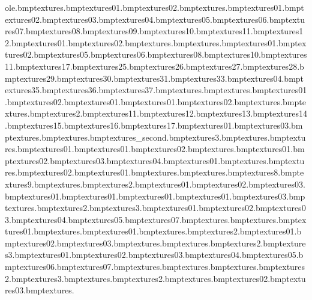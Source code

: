 ole.bmp textures\canlids.bmp textures\canmachineshutter01.bmp textures\canmachineshutter02.bmp textures\cardback.bmp textures\cardboard01.bmp textures\cardboard02.bmp textures\cardboard03.bmp textures\cardboard04.bmp textures\cardboard05.bmp textures\cardboard06.bmp textures\cardboard07.bmp textures\cardboard08.bmp textures\cardboard09.bmp textures\cardboard10.bmp textures\cardboard11.bmp textures\cardboard12.bmp textures\cards01.bmp textures\cards02.bmp textures\cashwindow.bmp textures\castleport.bmp textures\ceramictile01.bmp textures\ceramictile02.bmp textures\ceramictile05.bmp textures\ceramictile06.bmp textures\ceramictile08.bmp textures\ceramictile10.bmp textures\ceramictile11.bmp textures\ceramictile17.bmp textures\ceramictile25.bmp textures\ceramictile26.bmp textures\ceramictile27.bmp textures\ceramictile28.bmp textures\ceramictile29.bmp textures\ceramictile30.bmp textures\ceramictile31.bmp textures\ceramictile33.bmp textures\shopsgensign04.bmp textures\ceramictile35.bmp textures\ceramictile36.bmp textures\ceramictile37.bmp textures\cerealsides.bmp textures\chain.bmp textures\chairback01.bmp textures\chairback02.bmp textures\chairleg01.bmp textures\choc01.bmp textures\choc02.bmp textures\chocblu.bmp textures\chocwap.bmp textures\chocwap2.bmp textures\chubcons11.bmp textures\chubcons12.bmp textures\chubcons13.bmp textures\chubcons14.bmp textures\chubcons15.bmp textures\chubcons16.bmp textures\chubcons17.bmp textures\chubneon01.bmp textures\chubsafe03.bmp textures\citytarmac.bmp textures\citythird.bmp textures\city_second.bmp textures\cleaner3.bmp textures\clockback.bmp textures\clockface.bmp textures\clockfloor01.bmp textures\clockhand01.bmp textures\clockhand02.bmp textures\clocklight.bmp textures\clockrfront01.bmp textures\clockrfront02.bmp textures\clockrfront03.bmp textures\clockrfront04.bmp textures\clockroof01.bmp textures\clockshine.bmp textures\clockticker.bmp textures\clockticker02.bmp textures\clocktile01.bmp textures\comentatorinfo.bmp textures\commontatortv.bmp textures\companel8.bmp textures\companel9.bmp textures\cricketstumps.bmp textures\cricketstumps2.bmp textures\crispbutton01.bmp textures\crispbutton02.bmp textures\crispbutton03.bmp textures\crispfront01.bmp textures\crisps01.bmp textures\crispside01.bmp textures\crisptop01.bmp textures\deptlight03.bmp textures\detonatorhandle.bmp textures\detonatorhandle2.bmp textures\detonatorhandle3.bmp textures\domino01.bmp textures\domino02.bmp textures\domino03.bmp textures\domino04.bmp textures\domino05.bmp textures\domino07.bmp textures\dominoback.bmp textures\dominoside.bmp textures\doughnutchocolate01.bmp textures\doughnutinside.bmp textures\doughnutjam01.bmp textures\doughnutsprinkles.bmp textures\doughnutsprinkles2.bmp textures\dynamite01.bmp textures\dynamite02.bmp textures\dynamite03.bmp textures\dynamitecrate.bmp textures\electricwindow.bmp textures\electricwindow2.bmp textures\electricwindow3.bmp textures\firework01.bmp textures\firework02.bmp textures\firework03.bmp textures\firework04.bmp textures\firework05.bmp textures\firework06.bmp textures\firework07.bmp textures\flag.bmp textures\flask.bmp textures\fries.bmp textures\fries2.bmp textures\fries3.bmp textures\frontdoorwindow.bmp textures\frontdoorwindow2.bmp textures\fuse.bmp textures\generator02.bmp textures\generator03.bmp textures.